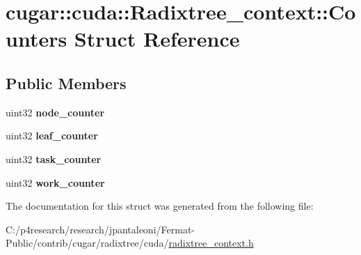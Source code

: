 \hypertarget{structcugar_1_1cuda_1_1_radixtree__context_1_1_counters}{}\section{cugar\+:\+:cuda\+:\+:Radixtree\+\_\+context\+:\+:Counters Struct Reference}
\label{structcugar_1_1cuda_1_1_radixtree__context_1_1_counters}
\subsection*{Public Members}
\begin{DoxyCompactItemize}
\item 
\mbox{\label{structcugar_1_1cuda_1_1_radixtree__context_1_1_counters_a43fa8a7e277dae646b1b508663e37215}} 
uint32 {\bfseries node\+\_\+counter}
\item 
\mbox{\label{structcugar_1_1cuda_1_1_radixtree__context_1_1_counters_a0d3fa1418919abda8ef4eb134136b595}} 
uint32 {\bfseries leaf\+\_\+counter}
\item 
\mbox{\label{structcugar_1_1cuda_1_1_radixtree__context_1_1_counters_ab107ee665767466b81c4bd8d003e7952}} 
uint32 {\bfseries task\+\_\+counter}
\item 
\mbox{\label{structcugar_1_1cuda_1_1_radixtree__context_1_1_counters_a51dbfed3bb5396f7f00b50592ed77cfc}} 
uint32 {\bfseries work\+\_\+counter}
\end{DoxyCompactItemize}


The documentation for this struct was generated from the following file\+:\begin{DoxyCompactItemize}
\item 
C\+:/p4research/research/jpantaleoni/\+Fermat-\/\+Public/contrib/cugar/radixtree/cuda/\hyperlink{radixtree__context_8h}{radixtree\+\_\+context.\+h}\end{DoxyCompactItemize}
